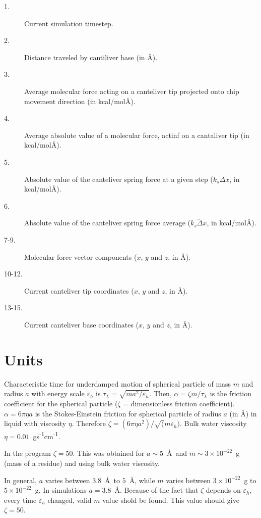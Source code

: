 \documentclass[a4paper]{article}
\begin{document}
\begin{description}
\item[1.] Current simulation timestep.
\item[2.] Distance traveled by cantiliver base (in \AA).
\item[3.] Average molecular force acting on a canteliver tip projected onto chip movement direction (in kcal/mol\AA).
\item[4.] Average absolute value of a molecular force, actinf on a cantaliver tip (in kcal/mol\AA).
\item[5.] Absolute value of the canteliver spring force at a given step ($k_s\Delta x$, in kcal/mol\AA).
\item[6.] Absolute value of the canteliver spring force average ($\overline{k_s\Delta x}$, in kcal/mol\AA).
\item[7-9.] Molecular force vector components ($x$, $y$ and $z$, in \AA).
\item[10-12.] Current canteliver tip coordinates ($x$, $y$ and $z$, in \AA).
\item[13-15.] Current canteliver base coordinates ($x$, $y$ and $z$, in \AA).
\end{description}

\section{Units}
\label{sec:units}

Characteristic time for underdamped motion of spherical particle of mass $m$ and radius $a$ with energy scale $\varepsilon_h$ is $\tau_L = \sqrt{m a^2/\varepsilon_h}$. Then, $\alpha = \zeta m/\tau_L$ is the friction coefficient for the spherical particle ($\zeta$ = dimensionless friction coefficient). $\alpha = 6\pi\eta a$ is the Stokes-Einstein friction for spherical particle of radius $a$ (in \AA) in liquid with viscosity $\eta$. Therefore $\zeta = (6\pi\eta a^2)/\sqrt(m\varepsilon_h)$. 
Bulk water viscosity $\eta = 0.01$~gs\textsuperscript{-1}cm\textsuperscript{-1}.

In the program $\zeta = 50$. This was obtained for $a \sim 5$~\AA\ and $m \sim 3\times10^{-22}$~g (mass of a residue) and using bulk water viscosity.

In general, $a$ varies between $3.8$~\AA\ to $5$~\AA, while $m$ varies between $3\times10^{-22}$~g to $5\times10^{-22}$~g. In simulations $a = 3.8$~\AA. Because of the fact that $\zeta$ depends on $\varepsilon_h$, every time $\varepsilon_h$ changed, valid $m$ value shold be found. This value should give $\zeta = 50$.
\end{document}
